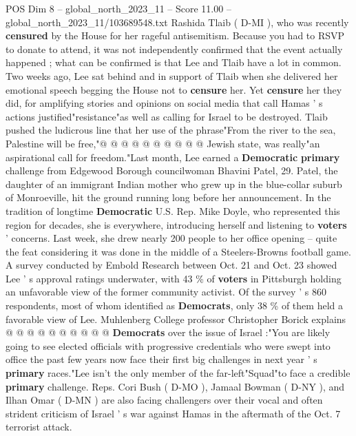 \begin{textsample}{POS Dim 8 – global\_north\_2023\_11 – Score 11.00 – global\_north\_2023\_11/103689548.txt}
Rashida Tlaib ( D-MI ), who was recently \textbf{censured} by the House for her rageful antisemitism.
Because you had to RSVP to donate to attend, it was not independently confirmed that the event actually happened ; what can be confirmed is that Lee and Tlaib have a lot in common.
Two weeks ago, Lee sat behind and in support of Tlaib when she delivered her emotional speech begging the House not to \textbf{censure} her.
Yet \textbf{censure} her they did, for amplifying stories and opinions on social media that call Hamas ' s actions justified"resistance"as well as calling for Israel to be destroyed.
Tlaib pushed the ludicrous line that her use of the phrase"From the river to the sea, Palestine will be free,"@ @ @ @ @ @ @ @ @ @ Jewish state, was really"an aspirational call for freedom."Last month, Lee earned a \textbf{Democratic} \textbf{primary} challenge from Edgewood Borough councilwoman Bhavini Patel, 29.
Patel, the daughter of an immigrant Indian mother who grew up in the blue-collar suburb of Monroeville, hit the ground running long before her announcement.
In the tradition of longtime \textbf{Democratic} U.S.
Rep.
Mike Doyle, who represented this region for decades, she is everywhere, introducing herself and listening to \textbf{voters} ' concerns.
Last week, she drew nearly 200 people to her office opening -- quite the feat considering it was done in the middle of a Steelers-Browns football game.
A survey conducted by Embold Research between Oct. 21 and Oct. 23 showed Lee ' s approval ratings underwater, with 43 \% of \textbf{voters} in Pittsburgh holding an unfavorable view of the former community activist.
Of the survey ' s 860 respondents, most of whom identified as \textbf{Democrats}, only 38 \% of them held a favorable view of Lee.
Muhlenberg College professor Christopher Borick explains @ @ @ @ @ @ @ @ @ @ \textbf{Democrats} over the issue of Israel :"You are likely going to see elected officials with progressive credentials who were swept into office the past few years now face their first big challenges in next year ' s \textbf{primary} races."Lee isn't the only member of the far-left"Squad"to face a credible \textbf{primary} challenge.
Reps.
Cori Bush ( D-MO ), Jamaal Bowman ( D-NY ), and Ilhan Omar ( D-MN ) are also facing challengers over their vocal and often strident criticism of Israel ' s war against Hamas in the aftermath of the Oct. 7 terrorist attack.

\end{textsample}
